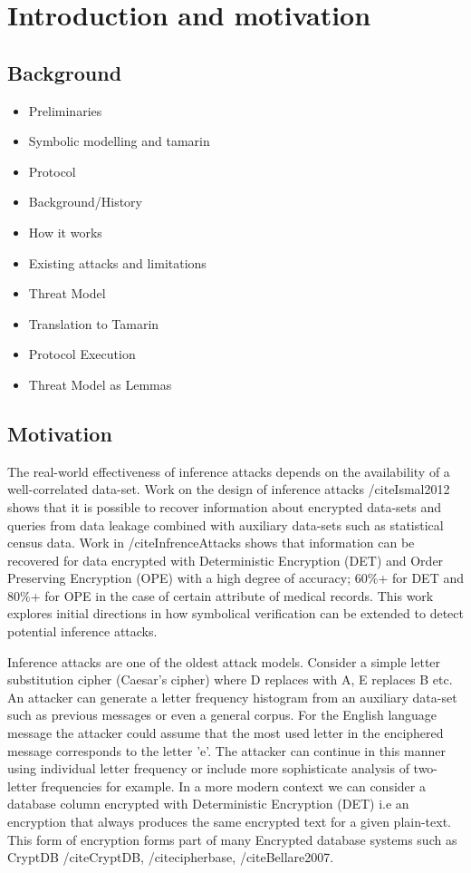 \documentclass[journal]{IEEEtran}
\begin{document}
\section{Introduction and motivation}

\subsection{Background}
\begin{itemize}
\item Preliminaries
\item 	Symbolic modelling and tamarin
\item Protocol
\item 	Background/History
\item 	How it works
\item 	Existing attacks and limitations
\item Threat Model
\item Translation to Tamarin
\item 	Protocol Execution
\item 	Threat Model as Lemmas
\end{itemize}

\subsection{Motivation}
The real-world effectiveness of inference attacks depends on the availability of a well-correlated data-set. Work on the design of inference attacks /cite{Ismal2012} shows that it is possible to recover information about encrypted data-sets and queries from data leakage combined with auxiliary data-sets such as statistical census data. Work in /cite{InfrenceAttacks} shows that information can be recovered for data encrypted with Deterministic Encryption (DET) and Order Preserving Encryption (OPE) with a high degree of accuracy; 60\%+ for DET and 80\%+ for OPE in the case of certain attribute of medical records. 
This work explores initial directions in how symbolical verification can be extended to detect potential inference attacks.

Inference attacks are one of the oldest attack models. Consider a simple letter substitution cipher (Caesar's cipher) where D replaces with A, E replaces B etc. An attacker can generate a letter frequency histogram from an auxiliary data-set such as previous messages or even a general corpus. For the English language message the attacker could assume that the most used letter in the enciphered message corresponds to the letter 'e'. The attacker can continue in this manner using individual letter frequency or include more sophisticate analysis of two-letter frequencies for example.
In a more modern context we can consider a database column encrypted with Deterministic Encryption (DET) i.e an encryption that always produces the same encrypted text for a given plain-text. This form of encryption forms part of many Encrypted database systems such as CryptDB /cite{CryptDB}, /cite{cipherbase}, /cite{Bellare2007}. 
\end{document}
